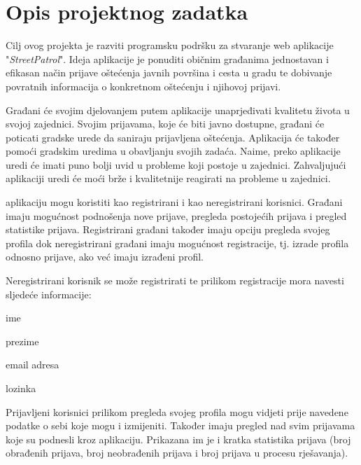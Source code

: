 \chapter{Opis projektnog zadatka}
		
		Cilj ovog projekta je razviti programsku podršku za stvaranje web aplikacije "\textit{StreetPatrol}". Ideja aplikacije je ponuditi običnim građanima jednostavan i efikasan način prijave oštećenja javnih površina i cesta u gradu te dobivanje povratnih informacija o konkretnom oštećenju i njihovoj prijavi. 
		
		Građani će svojim djelovanjem putem aplikacije unaprjeđivati kvalitetu života u svojoj zajednici. Svojim prijavama, koje će biti javno dostupne, građani će poticati gradske urede da saniraju prijavljena oštećenja. Aplikacija će također pomoći gradskim uredima u obavljanju svojih zadaća. Naime, preko aplikacije uredi će imati puno bolji uvid u probleme koji postoje u zajednici. Zahvaljujući aplikaciji uredi će moći brže i kvalitetnije reagirati na probleme u zajednici.
		
		 aplikaciju mogu koristiti kao registrirani i kao neregistrirani korisnici. Građani imaju mogućnost podnošenja nove prijave, pregleda postojećih prijava i pregled statistike prijava. Registrirani građani također imaju opciju pregleda svojeg profila dok neregistrirani građani imaju mogućnost registracije, tj. izrade profila odnosno prijave, ako već imaju izrađeni profil.
		
		Neregistrirani korisnik se može registrirati te prilikom registracije mora navesti sljedeće informacije:
		\begin{packed_item} 
			\item ime
			\item prezime
			\item email adresa
			\item lozinka
		\end{packed_item}  
		Prijavljeni korisnici prilikom pregleda svojeg profila mogu vidjeti prije navedene podatke o sebi koje mogu i izmijeniti. Također imaju pregled nad svim prijavama koje su podnesli kroz aplikaciju. Prikazana im je i kratka statistika prijava (broj obrađenih prijava, broj neobrađenih prijava i broj prijava u procesu rješavanja). 
		
